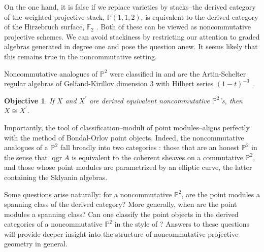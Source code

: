 \documentclass[11pt]{article}
\newtheorem{objective}{Objective}
\begin{document}
On the one hand, it is false if we replace varieties by stacks--the derived category of the weighted projective stack, $\mathbb{P}(1,1,2)$, is equivalent to the derived category of the Hirzebruch surface, $\mathbb{F}_2$ \cite{BF12}.
Both of these can be viewed as noncommutative projective schemes.
We can avoid stackiness by restricting our attention to graded algebras generated in degree one and pose the question anew.
It seems likely that this remains true in the noncommutative setting.

Noncommutative analogues of $\mathbb{P}^2$ were classified in \cite{ATV,Stephenson96,Stephenson97} and are the Artin-Schelter regular algebras \cite{AS87} of Gelfand-Kirillov dimension 3 with Hilbert series $(1-t)^{-3}$ \cite[Section 11]{SVdB01}.
\begin{tcolorbox}\begin{objective}
    If $X$ and $X^\prime$ are derived equivalent noncommutative $\mathbb{P}^2$'s, then $X \cong X^\prime$.
  \end{objective}
\end{tcolorbox}

Importantly, the tool of classification--moduli of point modules--aligns perfectly with the method of Bondal-Orlov point objects.
Indeed, the noncommutative analogues of a $\mathbb{P}^2$ fall broadly into two categories \cite{Stafford02}: those that are an honest $\mathbb{P}^2$ in the sense that $\operatorname{qgr} A$ is equivalent to the coherent sheaves on a commutative $\mathbb{P}^2$, and those whose point modules are parametrized by an elliptic curve, the latter containing the Sklyanin algebras.

Some questions arise naturally: for a noncommutative $\mathbb{P}^2$, are the point modules a spanning class of the derived category?
More generally, when are the point modules a spanning class?
Can one classify the point objects in the derived categories of a noncommutative $\mathbb{P}^2$ in the style of \cite{Bondal-Orlov}?
Answers to these questions will provide deeper insight into the structure of noncommutative projective geometry in general.

\end{document}
